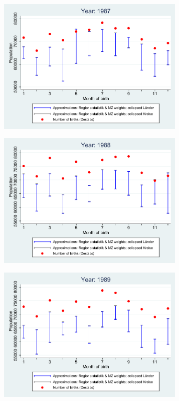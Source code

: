 \documentclass[a4paper ]{article}
\begin{document}
\begin{figure}[h]
\begin{subfigure}[t]{0.48\textwidth}
		\includegraphics[width=0.99\textwidth]{comparison_population_1987.pdf}		
\end{subfigure}
\begin{subfigure}[t]{0.48\textwidth}
		\centering
		\includegraphics[width=0.99\textwidth]{comparison_population_1988.pdf}		
\end{subfigure}
\begin{subfigure}[t]{0.48\textwidth}
		\centering
		\includegraphics[width=0.99\textwidth]{comparison_population_1989.pdf}		
\end{subfigure}
\end{figure}
\end{document}
